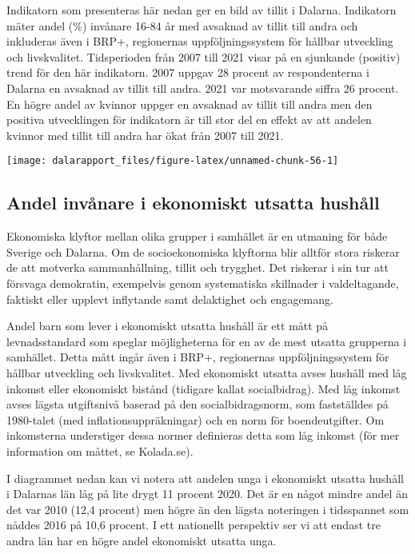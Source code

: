 \documentclass[
]{article}
\begin{document}
Indikatorn som presenteras här nedan ger en bild av tillit i Dalarna.
Indikatorn mäter andel (\%) invånare 16-84 år med avsaknad av tillit
till andra och inkluderas även i BRP+, regionernas uppföljningssystem
för hållbar utveckling och livskvalitet. Tidsperioden från 2007 till
2021 visar på en sjunkande (positiv) trend för den här indikatorn. 2007
uppgav 28 procent av respondenterna i Dalarna en avsaknad av tillit till
andra. 2021 var motsvarande siffra 26 procent. En högre andel av kvinnor
uppger en avsaknad av tillit till andra men den positiva utvecklingen
för indikatorn är till stor del en effekt av att andelen kvinnor med
tillit till andra har ökat från 2007 till 2021.

\begin{center}\texttt{[image: dalarapport\_files/figure-latex/unnamed-chunk-56-1]} \end{center}

\hypertarget{andel-invuxe5nare-i-ekonomiskt-utsatta-hushuxe5ll}{%
\subsection{Andel invånare i ekonomiskt utsatta
hushåll}\label{andel-invuxe5nare-i-ekonomiskt-utsatta-hushuxe5ll}}

Ekonomiska klyftor mellan olika grupper i samhället är en utmaning för
både Sverige och Dalarna. Om de socioekonomiska klyftorna blir alltför
stora riskerar de att motverka sammanhållning, tillit och trygghet. Det
riskerar i sin tur att försvaga demokratin, exempelvis genom
systematiska skillnader i valdeltagande, faktiskt eller upplevt
inflytande samt delaktighet och engagemang.

Andel barn som lever i ekonomiskt utsatta hushåll är ett mått på
levnadsstandard som speglar möjligheterna för en av de mest utsatta
grupperna i samhället. Detta mått ingår även i BRP+, regionernas
uppföljningssystem för hållbar utveckling och livskvalitet. Med
ekonomiskt utsatta avses hushåll med låg inkomst eller ekonomiskt
bistånd (tidigare kallat socialbidrag). Med låg inkomst avses lägsta
utgiftsnivå baserad på den socialbidragsnorm, som fastställdes på
1980-talet (med inflationsuppräkningar) och en norm för boendeutgifter.
Om inkomsterna understiger dessa normer definieras detta som låg inkomst
(för mer information om måttet, se Kolada.se).

I diagrammet nedan kan vi notera att andelen unga i ekonomiskt utsatta
hushåll i Dalarnas län låg på lite drygt 11 procent 2020. Det är en
något mindre andel än det var 2010 (12,4 procent) men högre än den
lägsta noteringen i tidsspannet som nåddes 2016 på 10,6 procent. I ett
nationellt perspektiv ser vi att endast tre andra län har en högre andel
ekonomiskt utsatta unga.
\end{document}
